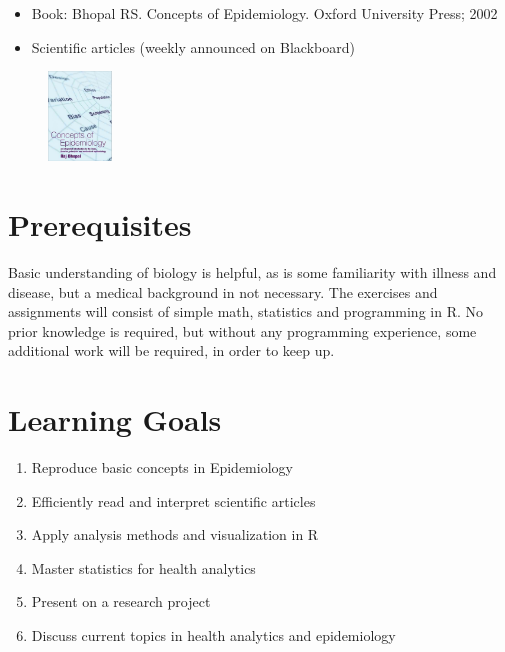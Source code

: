 \documentclass[11pt]{article}
\begin{document}
\begin{itemize}
\item Book: Bhopal RS. Concepts of Epidemiology. Oxford University Press; 2002  
\item Scientific articles (weekly announced on Blackboard)
\end{itemize}  


\begin{figure}
\includegraphics[width=0.15\textwidth,angle=0]{Cover_Bhopal.png}
\end{figure}



\section*{Prerequisites}
Basic understanding of biology is helpful, as is some familiarity with illness and disease, but a medical background in not necessary. The exercises and assignments will consist of simple math, statistics and programming in R. No prior knowledge is required, but without any programming experience, some additional work will be required, in order to keep up.


\section*{Learning Goals}
\begin{enumerate}
\item Reproduce basic concepts in Epidemiology
\item Efficiently read and interpret scientific articles
\item Apply analysis methods and visualization in R
\item Master statistics for health analytics
\item Present on a research project
\item Discuss current topics in health analytics and epidemiology


\end{enumerate}
\end{document}
